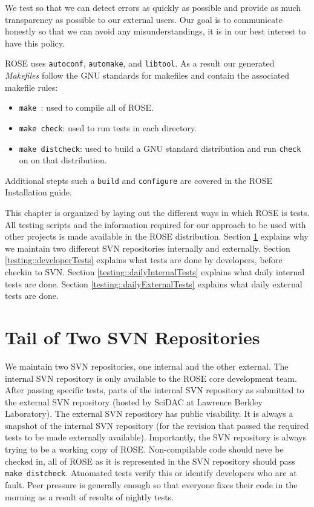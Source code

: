    We test so that we can detect errors as quickly as possible and
provide as much transparency as possible to our external users.
Our goal is to communicate honestly so that we can avoid any 
misunderstandings, it is in our best interest to have this
policy.

   ROSE uses {\tt autoconf}, {\tt automake}, and {\tt libtool}.
As a result our generated {\em Makefiles} follow the GNU
standards for makefiles and contain the associated makefile rules:
\begin{itemize}
   \item {\tt make }: used to compile all of ROSE.
   \item {\tt make check}: used to run tests in each directory.
   \item {\tt make distcheck}: used to build a GNU standard distribution and run {\tt check} on
    on that distribution.
\end{itemize}
Additional stepts such a {\tt build} and {\tt configure} are covered in the
ROSE Installation guide.

This chapter is organized by laying out the different
ways in which ROSE is tests.  All testing scripts and the information
required for our approach to be used with other projects is made available
in the ROSE distribution. 
Section \ref{testing::twoRepositories} explains why we maintain two
different SVN repositories internally and externally.
Section \ref{testing::developerTests} explains what tests are done by developers, before checkin to SVN.
Section \ref{testing::dailyInternalTests} explains what daily internal tests are done.
Section \ref{testing::dailyExternalTests} explains what daily external tests are done.

\section{Tail of Two SVN Repositories}
\label{testing::twoRepositories}
   We maintain two SVN repositories, one internal and the other external.
The internal SVN repository is only available to the ROSE core
development team.  After passing specific tests, parts of the internal
SVN repository as submitted to the external SVN repository (hosted by SciDAC at 
Lawrence Berkley Laboratory).  The external SVN repository has public
visability.  It is always a snapshot of the internal SVN repository 
(for the revision that passed the required tests to be made externally available).
Importantly, the SVN repository is always trying to be a working copy of
ROSE. Non-compilable code should neve be checked in, all of ROSE as it
is represented in the SVN repository should pass {\tt make distcheck}.
Atuomated tests verify this or identify developers who are at fault.
Peer pressure is generally enough so that everyone fixes their code 
in the morning as a result of results of nightly tests.

